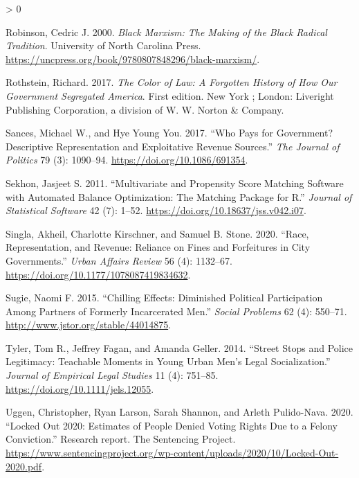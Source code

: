 \documentclass[
  12pt,
]{article}
\newlength{\cslhangindent}
\newenvironment{CSLReferences}[2] %
 {%
  \setlength{\parindent}{0pt}
  \ifodd #1 \everypar{\setlength{\hangindent}{\cslhangindent}}\ignorespaces\fi
  \ifnum #2 > 0
  \setlength{\parskip}{#2\baselineskip}
  \fi
 }%
 {}
\begin{document}
\begin{CSLReferences}{1}{0}
\leavevmode\hypertarget{ref-Robinson2000}{}%
Robinson, Cedric J. 2000. \emph{Black {Marxism}: The {Making} of the {Black Radical Tradition}}. {University of North Carolina Press}. \url{https://uncpress.org/book/9780807848296/black-marxism/}.

\leavevmode\hypertarget{ref-Rothstein2017}{}%
Rothstein, Richard. 2017. \emph{The Color of Law: A Forgotten History of How Our Government Segregated {America}}. First edition. {New York ; London}: {Liveright Publishing Corporation, a division of W. W. Norton \& Company}.

\leavevmode\hypertarget{ref-Sances2017}{}%
Sances, Michael W., and Hye Young You. 2017. {``Who {Pays} for {Government}? {Descriptive Representation} and {Exploitative Revenue Sources}.''} \emph{The Journal of Politics} 79 (3): 1090--94. \url{https://doi.org/10.1086/691354}.

\leavevmode\hypertarget{ref-Sekhon2011}{}%
Sekhon, Jasjeet S. 2011. {``Multivariate and {Propensity Score Matching Software} with {Automated Balance Optimization}: {The Matching} Package for {R}.''} \emph{Journal of Statistical Software} 42 (7): 1--52. \url{https://doi.org/10.18637/jss.v042.i07}.

\leavevmode\hypertarget{ref-Singla2020}{}%
Singla, Akheil, Charlotte Kirschner, and Samuel B. Stone. 2020. {``Race, {Representation}, and {Revenue}: {Reliance} on {Fines} and {Forfeitures} in {City Governments}.''} \emph{Urban Affairs Review} 56 (4): 1132--67. \url{https://doi.org/10.1177/1078087419834632}.

\leavevmode\hypertarget{ref-Sugie2015}{}%
Sugie, Naomi F. 2015. {``Chilling {Effects}: {Diminished Political Participation} Among {Partners} of {Formerly Incarcerated Men}.''} \emph{Social Problems} 62 (4): 550--71. \url{http://www.jstor.org/stable/44014875}.

\leavevmode\hypertarget{ref-Tyler2014}{}%
Tyler, Tom R., Jeffrey Fagan, and Amanda Geller. 2014. {``Street {Stops} and {Police Legitimacy}: {Teachable Moments} in {Young Urban Men}'s {Legal Socialization}.''} \emph{Journal of Empirical Legal Studies} 11 (4): 751--85. \url{https://doi.org/10.1111/jels.12055}.

\leavevmode\hypertarget{ref-Uggen2020}{}%
Uggen, Christopher, Ryan Larson, Sarah Shannon, and Arleth Pulido-Nava. 2020. {``Locked {Out} 2020: {Estimates} of {People Denied Voting Rights Due} to a {Felony Conviction}.''} Research report. {The Sentencing Project}. \url{https://www.sentencingproject.org/wp-content/uploads/2020/10/Locked-Out-2020.pdf}.


\end{CSLReferences}
\end{document}
